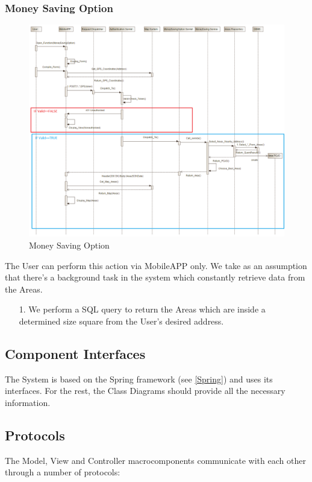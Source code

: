 \documentclass[12pt]{article}
\begin{document}
\subsubsection{Money Saving Option}
\begin{figure}[h]
	\centering
	\includegraphics[width=\textwidth]{../Images/Sequence_Final/Money_Saving}
	\caption{Money Saving Option}
\end{figure}
The User can perform this action via MobileAPP only.
We take as an assumption that there's a background task in the system which constantly retrieve data from the Areas.
\begin{enumerate}
	\item[1.] We perform a SQL query to return the Areas which are inside a determined size square from the User’s desired address.
\end{enumerate}
\clearpage


\subsection{Component Interfaces}
The System is based on the Spring framework (see \ref{Spring}) and uses its interfaces. For the rest, the Class Diagrams should provide all the necessary information.

\subsection{Protocols}
The Model, View and Controller macrocomponents communicate with each other through a number of protocols:
\end{document}
